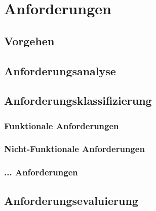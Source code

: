 \chapter{Anforderungen}
\label{ch:requirements}
\lipsum[1-1]

%
%
\section{Vorgehen}
\label{sec:requirements:approach}
\lipsum[1-1]

%
%
\section{Anforderungsanalyse}
\label{sec:requirements:analysis}
\lipsum[1-1]

%
%
\section{Anforderungsklassifizierung}
\label{sec:requirements:classification}
\lipsum[1-1]

\subsection{Funktionale Anforderungen}
\label{subsec:requirements:classification:functional}
\lipsum[1-1]

\subsection{Nicht-Funktionale Anforderungen}
\label{subsec:requirements:classification:nonfunctional}
\lipsum[1-1]

\subsection{... Anforderungen}
\label{subsec:requirements:classification:other}
\lipsum[1-1]

%
%
\section{Anforderungsevaluierung}
\label{sec:requirements:evaluation}
\lipsum[1-1]
